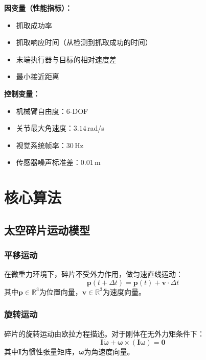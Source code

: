 \documentclass[12pt,a4paper]{ctexart}
\begin{document}
\textbf{因变量（性能指标）：}
\begin{itemize}
  \item 抓取成功率
  \item 抓取响应时间（从检测到抓取成功的时间）
  \item 末端执行器与目标的相对速度差
  \item 最小接近距离
\end{itemize}

\textbf{控制变量：}
\begin{itemize}
  \item 机械臂自由度：6-DOF
  \item 关节最大角速度：$3.14$\,rad/s
  \item 视觉系统帧率：30\,Hz
  \item 传感器噪声标准差：$0.01$\,m
\end{itemize}


\section{核心算法}

\subsection{太空碎片运动模型}

\subsubsection{平移运动}

在微重力环境下，碎片不受外力作用，做匀速直线运动：
\begin{equation}
  \mathbf{p}(t+\Delta t) = \mathbf{p}(t) + \mathbf{v} \cdot \Delta t
\end{equation}
其中$\mathbf{p} \in \mathbb{R}^3$为位置向量，$\mathbf{v} \in \mathbb{R}^3$为速度向量。

\subsubsection{旋转运动}

碎片的旋转运动由欧拉方程描述。对于刚体在无外力矩条件下：
\begin{equation}
  \mathbf{I} \dot{\boldsymbol{\omega}} + \boldsymbol{\omega} \times (\mathbf{I} \boldsymbol{\omega}) = \mathbf{0}
\end{equation}
其中$\mathbf{I}$为惯性张量矩阵，$\boldsymbol{\omega}$为角速度向量。
\end{document}
